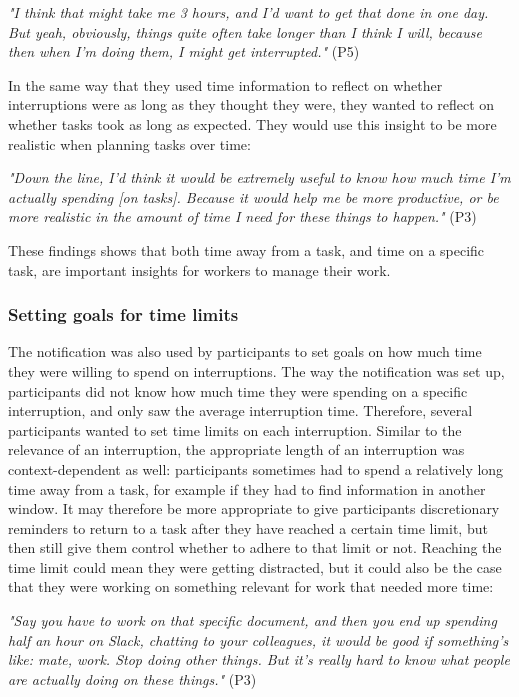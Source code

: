 \textit{"I think that might take me 3 hours, and I’d want to get that done in one day. But yeah, obviously, things quite often take longer than I think I will, because then when I’m doing them, I might get interrupted."} (P5)

 In the same way that they used time information to reflect on whether interruptions were as long as they thought they were, they wanted to reflect on whether tasks took as long as expected. They would use this insight to be more realistic when planning tasks over time: 

\textit{"Down the line, I’d think it would be extremely useful to know how much time I’m actually spending [on tasks]. Because it would help me be more productive, or be more realistic in the amount of time I need for these things to happen."} (P3) 

These findings shows that both time away from a task, and time on a specific task, are important insights for workers to manage their work.

\subsubsection{Setting goals for time limits}
The notification was also used by participants to set goals on how much time they were willing to spend on interruptions. The way the notification was set up, participants did not know how much time they were spending on a specific interruption, and only saw the average interruption time. Therefore, several participants wanted to set time limits on each interruption. Similar to the relevance of an interruption, the appropriate length of an interruption was context-dependent as well: participants sometimes had to spend a relatively long time away from a task, for example if they had to find information in another window. It may therefore be more appropriate to give participants discretionary reminders to return to a task after they have reached a certain time limit, but then still give them control whether to adhere to that limit or not. Reaching the time limit could mean they were getting distracted, but it could also be the case that they were working on something relevant for work that needed more time: 

\textit{"Say you have to work on that specific document, and then you end up spending half an hour on Slack, chatting to your colleagues, it would be good if something's like: mate, work. Stop doing other things. But it’s really hard to know what people are actually doing on these things."} (P3)

